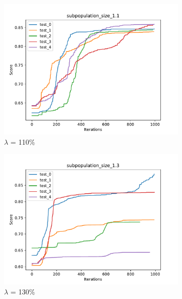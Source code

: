 \begin{figure}[H]
    \centering 
    \begin{subfigure}[b]{0.49\linewidth}
        \includegraphics[width=\linewidth]{img/subpopulation_size_1.1.pdf}
        \caption{$\lambda$ = 110\%}
    \end{subfigure}
    \begin{subfigure}[b]{0.49\linewidth}
        \includegraphics[width=\linewidth]{img/subpopulation_size_1.3.pdf}
        \caption{$\lambda$ = 130\%}
    \end{subfigure}
    \begin{subfigure}[b]{0.49\linewidth}

\end{subfigure}
\end{figure}

